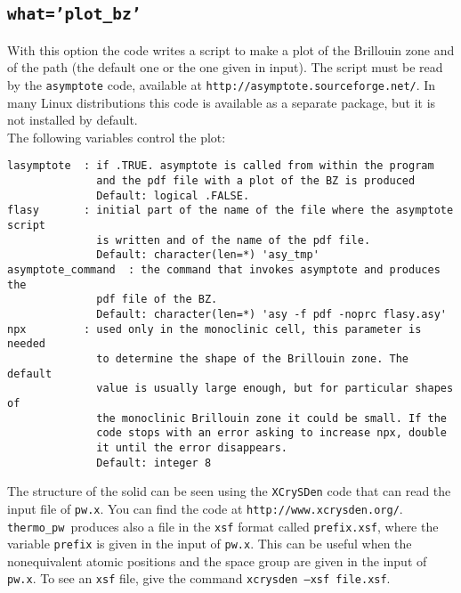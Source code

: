 \documentclass[12pt,a4paper]{article}
\def\thermo{\texttt{thermo\_pw}}
\begin{document}
\subsection{\color{web-blue}\texttt{what='plot\_bz'}}
With this option the code writes a script to make a plot
of the Brillouin zone and of the path (the default one or the one given in 
input). 
The script must be read by the \texttt{asymptote} code, available at 
\texttt{http://asymptote.sourceforge.net/}. In many Linux distributions
this code is available as a separate package, but it is not installed by
default. \\
The following variables control the plot:
\begin{verbatim}
lasymptote  : if .TRUE. asymptote is called from within the program
              and the pdf file with a plot of the BZ is produced
              Default: logical .FALSE.
flasy       : initial part of the name of the file where the asymptote script
              is written and of the name of the pdf file.
              Default: character(len=*) 'asy_tmp'
asymptote_command  : the command that invokes asymptote and produces the 
              pdf file of the BZ.
              Default: character(len=*) 'asy -f pdf -noprc flasy.asy'
npx         : used only in the monoclinic cell, this parameter is needed
              to determine the shape of the Brillouin zone. The default
              value is usually large enough, but for particular shapes of
              the monoclinic Brillouin zone it could be small. If the
              code stops with an error asking to increase npx, double 
              it until the error disappears.
              Default: integer 8
\end{verbatim}
The structure of the solid can be seen using the \texttt{XCrySDen} code
that can read the input file of \texttt{pw.x}. You can find the code at
\texttt{http://www.xcrysden.org/}. \thermo\ produces also a file in the
\texttt{xsf} format called \texttt{prefix.xsf}, where the variable 
\texttt{prefix}
is given in the input of \texttt{pw.x}. This can be useful when
the nonequivalent atomic positions and the space group are given in the input
of \texttt{pw.x}. To see an \texttt{xsf} file, give the command
\texttt{xcrysden --xsf file.xsf}.
\end{document}
